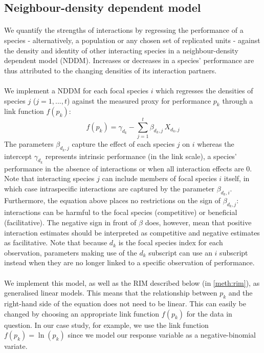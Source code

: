 \documentclass[a4,12pt]{article}
\begin{document}
\begin{refsection}
    \subsection{Neighbour-density dependent model}
    \label{meth:nddm}    

        \paragraph{}
        We quantify the strengths of interactions by regressing the performance of a species  - alternatively, a population or any chosen set of replicated units - against the density and identity of other interacting species in a neighbour-density dependent model (NDDM).  Increases or decreases in a species' performance are thus attributed to the changing densities of its interaction partners. 

        \paragraph{}
        We implement a NDDM for each focal species $i$ which regresses the densities of species $j$ ($j = 1, ..., t$) against the measured proxy for performance $p_{k}$ through a link function $f(p_k)$:
        \begin{equation}
        f(p_{k}) = \gamma_{d_k} - \sum_{j=1}^{t} \beta_{d_k,j} \, X_{d_k,j}
        \label{nddm}
        \end{equation}
        The parameters $\beta_{d_k,j}$ capture the effect of each species $j$ on $i$ whereas the intercept $\gamma_{d_k}$ represents intrinsic performance (in the link scale), a species' performance in the absence of interactions or when all interaction effects are $0$. Note that interacting species $j$ can include members of focal species $i$ itself, in which case intraspecific interactions are captured by the parameter $\beta_{d_k,i}$. Furthermore, the equation above places no restrictions on the sign of $\beta_{d_k, j}$: interactions can be harmful to the focal species (competitive) or beneficial (facilitative). The negative sign in front of $\beta$ does, however, mean that positive interaction estimates should be interpreted as competitive and negative estimates as facilitative. Note that because $d_k$ is the focal species index for each observation, parameters making use of the $d_k$ subscript can use an $i$ subscript instead when they are no longer linked to a specific observation of performance.

        \paragraph{}
        We implement this model, as well as the RIM described below (in \ref{meth:rim}), as generalised linear models. This means that the relationship between $p_k$ and the right-hand side of the equation does not need to be linear. This can easily be changed by choosing an appropriate link function $f(p_k)$ for the data in question. In our case study, for example, we use the link function $f(p_k) = \ln(p_k)$ since we model our response variable as a negative-binomial variate.
              


\end{refsection}
\end{document}
